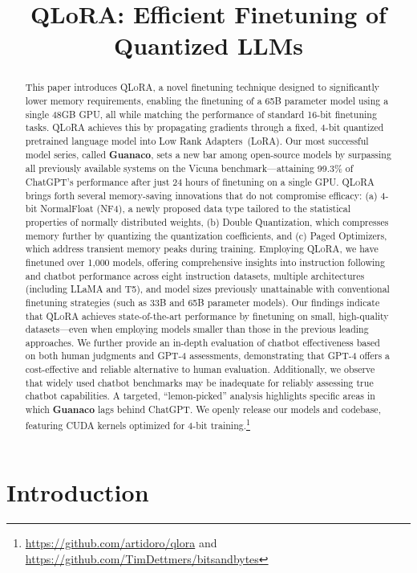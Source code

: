 \title{QLoRA: Efficient Finetuning of Quantized LLMs}

\begin{abstract}
This paper introduces \textsc{QLoRA}, a novel finetuning technique designed to significantly lower memory requirements, enabling the finetuning of a 65B parameter model using a single 48GB GPU, all while matching the performance of standard 16-bit finetuning tasks. \textsc{QLoRA} achieves this by propagating gradients through a fixed, 4-bit quantized pretrained language model into Low Rank Adapters~(LoRA). Our most successful model series, called \textbf{Guanaco}, sets a new bar among open-source models by surpassing all previously available systems on the Vicuna benchmark—attaining 99.3\% of ChatGPT’s performance after just 24 hours of finetuning on a single GPU. \textsc{QLoRA} brings forth several memory-saving innovations that do not compromise efficacy: (a) 4-bit NormalFloat (NF4), a newly proposed data type tailored to the statistical properties of normally distributed weights, (b) Double Quantization, which compresses memory further by quantizing the quantization coefficients, and (c) Paged Optimizers, which address transient memory peaks during training. Employing \textsc{QLoRA}, we have finetuned over 1,000 models, offering comprehensive insights into instruction following and chatbot performance across eight instruction datasets, multiple architectures (including LLaMA and T5), and model sizes previously unattainable with conventional finetuning strategies (such as 33B and 65B parameter models). Our findings indicate that \textsc{QLoRA} achieves state-of-the-art performance by finetuning on small, high-quality datasets—even when employing models smaller than those in the previous leading approaches. We further provide an in-depth evaluation of chatbot effectiveness based on both human judgments and GPT-4 assessments, demonstrating that GPT-4 offers a cost-effective and reliable alternative to human evaluation. Additionally, we observe that widely used chatbot benchmarks may be inadequate for reliably assessing true chatbot capabilities. A targeted, “lemon-picked” analysis highlights specific areas in which \textbf{Guanaco} lags behind ChatGPT. We openly release our models and codebase, featuring CUDA kernels optimized for 4-bit training.\footnote{\url{https://github.com/artidoro/qlora} and \url{https://github.com/TimDettmers/bitsandbytes}}
\end{abstract}

\section{Introduction}

